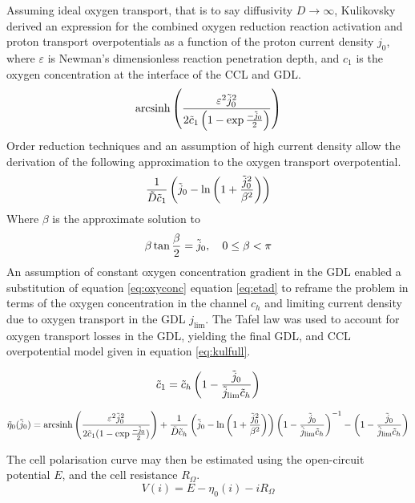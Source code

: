 Assuming ideal oxygen transport, that is to say diffusivity $D \rightarrow \infty$, Kulikovsky derived an expression for the combined oxygen reduction reaction activation and proton transport overpotentials as a function of the proton current density $j_0$, where $\varepsilon$ is Newman's dimensionless reaction penetration depth, and $c_1$ is the oxygen concentration at the interface of the CCL and GDL.
\begin{equation}
	\text{arcsinh}\left(\frac{\varepsilon^2 \tilde{j}_0^2}{2 \tilde{c}_1 \left(1 - \exp{\frac{-\tilde{j}_0}{2}}\right)}\right) \label{eq:eta}
\end{equation}
Order reduction techniques and an assumption of high current density allow the derivation of the following approximation to the oxygen transport overpotential.
\begin{equation}
	\frac{1}{\tilde{D}\tilde{c}_1}\left(\tilde{j}_0 - \ln\left(1 + \frac{\tilde{j}_0^2}{\beta^2}\right)\right) \label{eq:etad}
\end{equation}
Where $\beta$ is the approximate solution to
\begin{equation}
	\beta \tan{\frac{\beta}{2}} = \tilde{j}_0, \quad 0 \le \beta < \pi
\end{equation}
An assumption of constant oxygen concentration gradient in the GDL enabled a substitution of equation \ref{eq:oxyconc} equation \ref{eq:etad} to reframe the problem in terms of the oxygen concentration in the channel $c_h$ and limiting current density due to oxygen transport in the GDL $j_{\text{lim}}$. The Tafel law was used to account for oxygen transport losses in the GDL, yielding the final GDL, and CCL overpotential model given in equation \ref{eq:kulfull}.

\begin{equation}
	\tilde{c}_1 = \tilde{c}_h \left(1 - \frac{\tilde{j}_0}{\tilde{j}_{\text{lim}}\tilde{c}_h}\right)\label{eq:oxyconc}
\end{equation}

\begin{equation}
	\tilde{\eta}_0(\tilde{j}_0) = \text{arcsinh}\left(\frac{\varepsilon^2 \tilde{j}_0^2}{2 \tilde{c}_1 (1 - \exp{\frac{-\tilde{j}_0}{2}})}\right)
	+ \frac{1}{\tilde{D}\tilde{c}_h}\left(\tilde{j}_0 - \ln\left(1 + \frac{\tilde{j}_0^2}{\beta^2}\right)\right)\left(1 - \frac{\tilde{j}_0}{\tilde{j}_{\text{lim}}\tilde{c}_h}\right)^{-1}
	-\left(1 - \frac{\tilde{j}_0}{\tilde{j}_{\text{lim}}\tilde{c}_h}\right)
	\label{eq:kulfull}
\end{equation}

The cell polarisation curve may then be estimated using the open-circuit potential $E$, and the cell resistance \(R_{\Omega}\).
\begin{equation}
	V(i) = E - \eta_0(i) - iR_\Omega
\end{equation}


